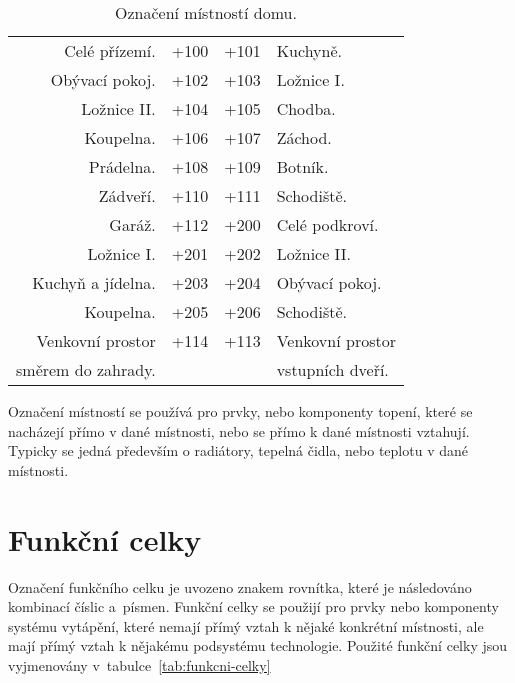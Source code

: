 \documentclass[a4paper,draft]{book}
\begin{document}
    \begin{table}[h]
        \centering
        \begin{tabular}{rl|rl}
            Celé přízemí.  & +100 & +101 & Kuchyně.\\
            Obývací pokoj. & +102 & +103 & Ložnice I.\\
            Ložnice II.    & +104 & +105 & Chodba.\\
            Koupelna.      & +106 & +107 & Záchod.\\
            Prádelna.      & +108 & +109 & Botník.\\
            Zádveří.       & +110 & +111 & Schodiště.\\
            Garáž.         & +112 & +200 & Celé podkroví.\\
            Ložnice I.     & +201 & +202 & Ložnice II.\\
            Kuchyň a jídelna. & +203 & +204 & Obývací pokoj.\\
            Koupelna.      & +205 & +206 & Schodiště.\\
            Venkovní prostor & +114 & +113 & Venkovní prostor\\
            směrem do zahrady. & & & vstupních dveří.\\
        \end{tabular}
        \caption{Označení místností domu.}
        \label{tab:room-numbers}
    \end{table}

    Označení místností se používá pro prvky, nebo komponenty topení, které
    se nacházejí přímo v dané místnosti, nebo se přímo k dané místnosti
    vztahují. Typicky se jedná především o radiátory, tepelná čidla, nebo
    teplotu v dané místnosti.

\section{Funkční celky}

    Označení funkčního celku je uvozeno znakem rovnítka, které je následováno
    kombinací číslic a~písmen. Funkční celky se použijí pro prvky nebo
    komponenty systému vytápění, které nemají přímý vztah k nějaké konkrétní
    místnosti, ale mají přímý vztah k nějakému podsystému technologie.
    Použité funkční celky jsou vyjmenovány v~tabulce~\ref{tab:funkcni-celky}
\end{document}
